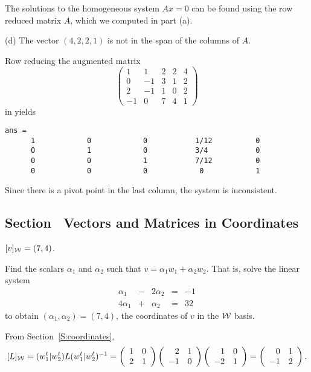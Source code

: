 \documentclass{ximera}
\begin{document}
\soln The solutions to the homogeneous system $Ax = 0$ can be found
using the row reduced matrix $A$, which we computed in part (a).

(d) \ans The vector $(4,2,2,1)$ is not in the span of the columns of
$A$.

\soln Row reducing the augmented matrix
\[
\left(\begin{array}{rrrr|r} 1 & 1 & 2 & 2 & 4 \\ 0 & -1 & 3 &
1 & 2 \\ 2 & -1 & 1 & 0 & 2 \\ -1 & 0 & 7 & 4 & 1 \end{array}\right)
\]
in \Matlab yields
\begin{verbatim}
ans =
      1            0            0           1/12          0      
      0            1            0           3/4           0      
      0            0            1           7/12          0      
      0            0            0            0            1      
\end{verbatim}
Since there is a pivot point in the last column, the system is
inconsistent.



\subsection*{Section~\protect{\ref{S:coordinates}} Vectors and Matrices in
Coordinates}

\ans $[v]_{\cal W} = (7,4)$.

\soln Find the scalars $\alpha_1$ and $\alpha_2$ such that $v = \alpha_1w_1
+ \alpha_2w_2$.  That is, solve the linear system
\[ \begin{array}{rrrrr}
\alpha_1 & - & 2\alpha_2 & = & -1 \\
4\alpha_1 & + & \alpha_2 & = & 32 \end{array} \]
to obtain $(\alpha_1,\alpha_2) = (7,4)$, the coordinates
of $v$ in the ${\cal W}$ basis.

From Section~\ref{S:coordinates},
\[
[L]_{\cal W} = (w_1^t|w_2^t)L(w_1^t|w_2^t)^{-1} =
\left(\begin{array}{rr} 1 & 0\\ 2 &1\end{array}\right)\left(\begin{array}{rr} 2 & 1\\ -1 &0\end{array}\right)\left(\begin{array}{rr} 1 & 0\\ -2 &1\end{array}\right) =
\left(\begin{array}{rr} 0 & 1\\ -1 &2\end{array}\right).
\]
\end{document}
